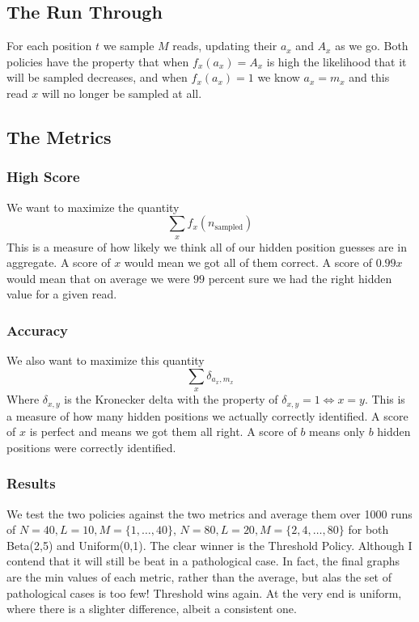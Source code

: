 \documentclass[phd,tocprelim]{cornell}
\begin{document}
\subsection{The Run Through}

For each position $t$ we sample $M$ reads, updating their $a_{x}$ and $A_{x}$ as we go. Both policies have the property that when $f_{x}(a_{x}) = A_{x}$ is high the likelihood that it will be sampled decreases, and when $f_{x}(a_{x}) = 1$ we know $a_{x} = m_{x}$ and this read $x$ will no longer be sampled at all.

\subsection{The Metrics}

\subsubsection{High Score}

We want to maximize the quantity
\begin{equation}
    \sum_{x} f_{x}(n_{\mbox{sampled}})
\end{equation}
This is a measure of how likely we think all of our hidden position guesses are in aggregate. A score of $x$ would mean we got all of them correct. A score of $0.99x$ would mean that on average we were $99$ percent sure we had the right hidden value for a given read.

\subsubsection{Accuracy}

We also want to maximize this quantity
\begin{equation}
    \sum_{x} \delta_{a_{x},m_{x}}
\end{equation}
Where $\delta_{x,y}$ is the Kronecker delta with the property of $\delta_{x,y} = 1 \Longleftrightarrow x = y$. This is a measure of how many hidden positions we actually correctly identified. A score of $x$ is perfect and means we got them all right. A score of $b$ means only $b$ hidden positions were correctly identified.

\subsubsection{Results}

We test the two policies against the two metrics and average them over 1000 runs of $N = 40, L = 10, M = \{1, \ldots, 40\}$, $N = 80, L = 20, M = \{2, 4, \ldots, 80\}$ for both Beta(2,5) and Uniform(0,1). The clear winner is the Threshold Policy. Although I contend that it will still be beat in a pathological case. In fact, the final graphs are the min values of each metric, rather than the average, but alas the set of pathological cases is too few! Threshold wins again. At the very end is uniform, where there is a slighter difference, albeit a consistent one.
\end{document}
